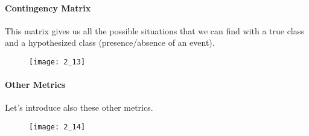 \paragraph{Contingency Matrix} This matrix gives us all the possible situations that we can find with a true class and a hypothesized class (presence/absence of an event).
\begin{figure}[H]
    \texttt{[image: 2\_13]}
    \centering
\end{figure}
\paragraph{Other Metrics} Let's introduce also these other metrics.
\begin{figure}[H]
    \texttt{[image: 2\_14]}
    \centering
\end{figure}